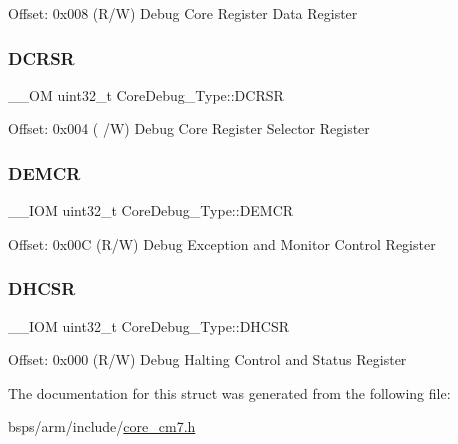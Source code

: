 Offset\+: 0x008 (R/W) Debug Core Register Data Register \mbox{\label{structCoreDebug__Type_af907cf64577eaf927dac6787df6dd98b}} 
\subsubsection{\texorpdfstring{DCRSR}{DCRSR}}
{\footnotesize\ttfamily \+\_\+\+\_\+\+OM uint32\+\_\+t Core\+Debug\+\_\+\+Type\+::\+D\+C\+R\+SR}

Offset\+: 0x004 ( /W) Debug Core Register Selector Register \mbox{\label{structCoreDebug__Type_aeb3126abc4c258a858f21f356c0df6ee}} 
\subsubsection{\texorpdfstring{DEMCR}{DEMCR}}
{\footnotesize\ttfamily \+\_\+\+\_\+\+I\+OM uint32\+\_\+t Core\+Debug\+\_\+\+Type\+::\+D\+E\+M\+CR}

Offset\+: 0x00C (R/W) Debug Exception and Monitor Control Register \mbox{\label{structCoreDebug__Type_ad63554e4650da91a8e79929cbb63db66}} 
\subsubsection{\texorpdfstring{DHCSR}{DHCSR}}
{\footnotesize\ttfamily \+\_\+\+\_\+\+I\+OM uint32\+\_\+t Core\+Debug\+\_\+\+Type\+::\+D\+H\+C\+SR}

Offset\+: 0x000 (R/W) Debug Halting Control and Status Register 

The documentation for this struct was generated from the following file\+:\begin{DoxyCompactItemize}
\item 
bsps/arm/include/\mbox{\hyperlink{core__cm7_8h}{core\+\_\+cm7.\+h}}\end{DoxyCompactItemize}
